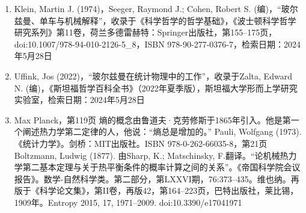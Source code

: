 \begin{enumerate}
\item Klein, Martin J. (1974)，Seeger, Raymond J.; Cohen, Robert S. (编)，“玻尔兹曼、单车与机械解释”，收录于《科学哲学的哲学基础》，《波士顿科学哲学研究系列》第11卷，荷兰多德雷赫特：Springer出版社，第155–175页，doi:10.1007/978-94-010-2126-5_8，ISBN 978-90-277-0376-7，检索日期：2024年5月28日  
\item Uffink, Jos (2022)，“玻尔兹曼在统计物理中的工作”，收录于Zalta, Edward N. (编)，《斯坦福哲学百科全书》（2022年夏季版），斯坦福大学形而上学研究实验室，检索日期：2024年5月28日  
\item Max Planck，第119页  
熵的概念由鲁道夫·克劳修斯于1865年引入。他是第一个阐述热力学第二定律的人，他说：“熵总是增加的。”  
Pauli, Wolfgang (1973). 《统计力学》。剑桥：MIT出版社。ISBN 978-0-262-66035-8，第21页  
Boltzmann, Ludwig (1877). 由Sharp, K.; Matschinsky, F.翻译。“论机械热力学第二基本定理与关于热平衡条件的概率计算之间的关系”。《帝国科学院会议报告》。数学-自然科学类。第二部分，第LXXVI期，76:373–435。维也纳。再版于《科学论文集》，第II卷，再版42，第164–223页，巴特出版社，莱比锡，1909年。Entropy 2015, 17, 1971–2009. doi:10.3390/e17041971
\end{enumerate}